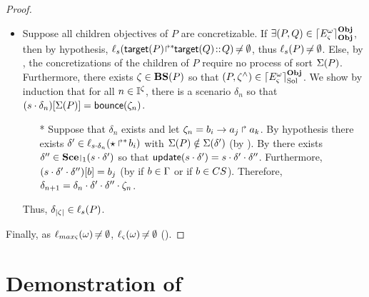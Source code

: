 \begin{proof}
\begin{itemize}
  \item Suppose all children objectives of $P$ are concretizable.
    If $\exists (P, Q) \in \lceil E_\varsigma^\omega\rceil^{\mathbf{Obj}}_{\mathbf{Obj}}$, then by hypothesis,
      $\ell_{s}({\mathsf{target}(P)\!\Rsh^*\!\!\mathsf{target}(Q)} \!::\! Q) \not\nobreak\mkern -2mu = \emptyset$, thus
      $\ell_{s}(P) \not\nobreak\mkern -2mu = \emptyset$.
    Else, by , the concretizations of the children of $P$ require no process of sort $\Sigma(P)$.
      Furthermore, there exists $\zeta \in \mathbf{BS}(P)$ so that $(P, \zeta^\wedge) \in \lceil E_\varsigma^\omega\rceil^{\mathbf{Obj}}_{\mathrm{Sol}}$.
      We show by induction that for all $n \in \mathbb{I}^{\zeta}$, there is a scenario $\delta_n$ so that ${(s \cdot \delta_n)[\Sigma(P)]} = \mathsf{bounce}(\zeta_n)$.
      \begin{itemize}
        \item[*] Suppose that $\delta_n$ exists and let $\zeta_n = b_i\rightarrow a_j\Rsh a_k$.
        By hypothesis there exists $\delta' \in \ell_{s \cdot \delta_n}(\mbox{$\star\Rsh^*\!b_i$})$ with $\Sigma(P) \notin \Sigma(\delta')$ (by ).
        By  there exists $\delta'' \in \restriction{\Sce}{1}(s \PHplay \delta')$ so that $\mathsf{update}(s \cdot \delta') = s \cdot \delta' \cdot \delta''$.
        Furthermore, ${(s \cdot \delta' \cdot \delta'')[b]} = b_j$ (by  if $b \in \Gamma$ or  if $b \in CS$).
        Therefore, $\delta_{n+1} = \delta_n \cdot \delta' \cdot \delta'' \cdot \zeta_n$.
      \end{itemize}
      Thus, $\delta_{|\zeta|} \in \ell_s(P)$. %
\end{itemize}
Finally, as $\ell_{max\varsigma}(\omega) \not\nobreak\mkern -2mu = \emptyset$, $\ell_\varsigma(\omega) \not\nobreak\mkern -2mu = \emptyset$ ().
\end{proof}



\section{Demonstration of }


